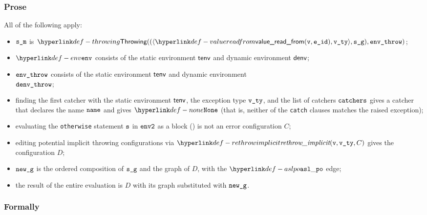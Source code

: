 \subsubsection{Prose}
All of the following apply:
\begin{itemize}
  \item $\sm$ is $\Throwing((\langle \valuereadfrom(\vv, \eid), \vvty \rangle, \sg), \envthrow)$;
  \item $\env$ consists of the static environment $\tenv$ and dynamic environment $\denv$;
  \item $\envthrow$ consists of the static environment $\tenv$ and dynamic environment \\ $\denvthrow$;
  \item finding the first catcher with the static environment $\tenv$, the exception type $\vvty$,
  and the list of catchers $\catchers$ gives a catcher that declares the name $\name$ and gives $\None$
  (that is, neither of the \texttt{catch} clauses matches the raised exception);
  \item evaluating the \texttt{otherwise} statement $\vs$ in $\envtwo$ as a block ()
  is not an error configuration $C$\ProseOrError;
  \item editing potential implicit throwing configurations via $\rethrowimplicit(\vv, \vvty, C)$
  gives the configuration $D$;
  \item $\newg$ is the ordered composition of $\sg$ and the graph of $D$,
  with the $\aslpo$ edge;
  \item the result of the entire evaluation is $D$ with its graph substituted with $\newg$.
\end{itemize}

\subsubsection{Formally}
\begin{mathpar}
\end{mathpar}


